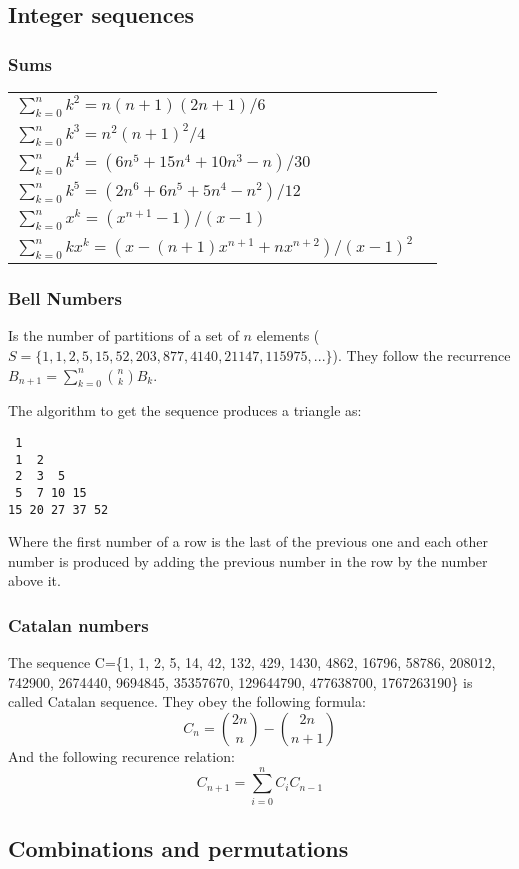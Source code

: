 \documentclass[10pt,letterpaper,twocolumn,twosided]{article}
\begin{document}
\subsection{Integer sequences}

\subsubsection{Sums}

\begin{tabular}{ll}
$\sum_{k=0}^{n}k^{2}=n(n+1)(2n+1)/6$   & \tabularnewline
$\sum_{k=0}^{n}k^{3}=n^{2}(n+1)^{2}/4$  & \tabularnewline
$\sum_{k=0}^{n}k^{4}=(6n^{5}+15n^{4}+10n^{3}-n)/30$   & \tabularnewline
$\sum_{k=0}^{n}k^{5}=(2n^{6}+6n^{5}+5n^{4}-n^{2})/12$  & \tabularnewline
$\sum_{k=0}^{n}x^{k}=(x^{n+1}-1)/(x-1)$  &    \tabularnewline
$\sum_{k=0}^{n}kx^{k}=(x-(n+1)x^{n+1}+nx^{n+2})/(x-1)^{2}$  & \tabularnewline
\end{tabular}

\subsubsection{Bell Numbers}

Is the number of partitions of a set of $n$ elements ($S=\{1, 1, 2, 5, 15, 52, 203, 877, 4140, 21147, 115975, ...\}$).
They follow the recurrence $B_{n+1} = \sum_{k=0}^n{ {n \choose k}B_k } $.

The algorithm to get the sequence produces a triangle as:

\begin{verbatim}
 1
 1  2
 2  3  5
 5  7 10 15
15 20 27 37 52
\end{verbatim}

Where the first number of a row is the last of the previous one and each other number is
produced by adding the previous number in the row by the number above it.

\subsubsection{Catalan numbers}

The sequence C=\{1, 1, 2, 5, 14, 42, 132, 429, 1430, 4862, 16796, 58786, 208012, 742900, 
2674440, 9694845, 35357670, 129644790, 477638700, 1767263190\} is called Catalan sequence. They
obey the following formula:
\[C_n = {2n \choose n} - {2n \choose n+1}\]
And the following recurence relation:
\[ C_{n+1} = \sum_{i=0}^n{C_i C_{n-1}} \]

\subsection{Combinations and permutations}
\end{document}

